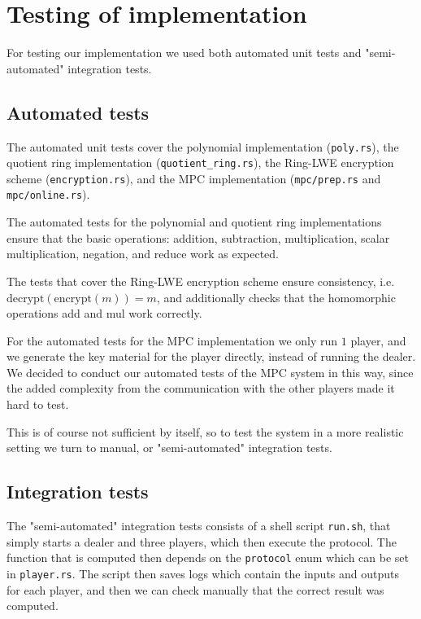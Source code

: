 \documentclass[../main.tex]{subfiles}
\begin{document}
\section{Testing of implementation}
For testing our implementation we used both automated unit tests and "semi-automated" integration tests.

\subsection{Automated tests}
The automated unit tests cover the polynomial implementation (\lstinline{poly.rs}), the quotient ring implementation (\lstinline{quotient_ring.rs}), the Ring-LWE encryption scheme (\lstinline{encryption.rs}), and the MPC implementation (\lstinline{mpc/prep.rs} and \lstinline{mpc/online.rs}).

The automated tests for the polynomial and quotient ring implementations ensure that the basic operations: addition, subtraction, multiplication, scalar multiplication, negation, and reduce work as expected.

The tests that cover the Ring-LWE encryption scheme ensure consistency, i.e. $\text{decrypt}(\text{encrypt}(m)) = m$, and additionally checks that the homomorphic operations add and mul work correctly.

For the automated tests for the MPC implementation we only run $1$ player, and we generate the key material for the player directly, instead of running the dealer. We decided to conduct our automated tests of the MPC system in this way, since the added complexity from the communication with the other players made it hard to test.

This is of course not sufficient by itself, so to test the system in a more realistic setting we turn to manual, or "semi-automated" integration tests.

\subsection{Integration tests}
The "semi-automated" integration tests consists of a shell script \lstinline{run.sh}, that simply starts a dealer and three players, which then execute the protocol. The function that is computed then depends on the \lstinline{protocol} enum which can be set in \lstinline{player.rs}. The script then saves logs which contain the inputs and outputs for each player, and then we can check manually that the correct result was computed.
\end{document}
